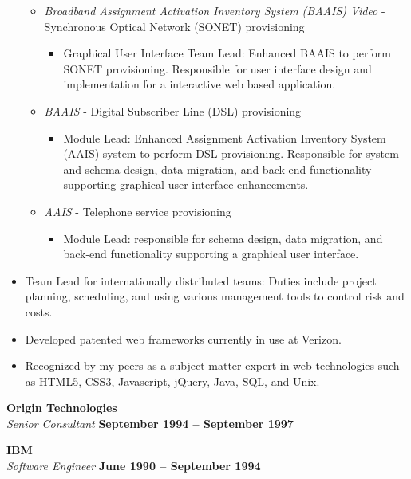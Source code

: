 \documentclass[margin,line]{resume}
\begin{document}
\begin{resume}
\begin{itemize}
\begin{itemize}
\begin{itemize}
      \end{itemize}
      \item \textsl{Broadband Assignment Activation Inventory System (BAAIS) Video} - Synchronous Optical Network (SONET) provisioning
      \begin{itemize}
          \item Graphical User Interface Team Lead: Enhanced BAAIS to perform SONET provisioning. Responsible for user interface design and implementation for a interactive web based application.
      \end{itemize}
      \item \textsl{BAAIS} - Digital Subscriber Line (DSL) provisioning
      \begin{itemize}
          \item Module Lead: Enhanced Assignment Activation Inventory System (AAIS) system to perform DSL provisioning. Responsible for system and schema design, data migration, and back-end functionality supporting graphical user interface enhancements.
      \end{itemize}
      \item \textsl{AAIS} - Telephone service provisioning
      \begin{itemize}
          \item Module Lead: responsible for schema design, data migration, and back-end functionality supporting a graphical user interface.
      \end{itemize}
      \end{itemize}
      \item Team Lead for internationally distributed teams: Duties include project planning, scheduling, and using various management tools to control risk and costs.
      \item Developed patented web frameworks currently in use at Verizon.
      \item Recognized by my peers as a subject matter expert in web technologies such as HTML5, CSS3, Javascript, jQuery, Java, SQL, and Unix.
    \end{itemize}

    \textbf{\listing Origin Technologies} \vspace{2mm}\\\vspace{1mm}%
    \textsl{Senior Consultant} \hfill \textbf{September 1994 -- September 1997}
    

    \textbf{\listing IBM} \vspace{2mm}\\\vspace{1mm}%
    \textsl{Software Engineer} \hfill \textbf{June 1990 -- September 1994}\\
    


\end{resume}
\end{document}
